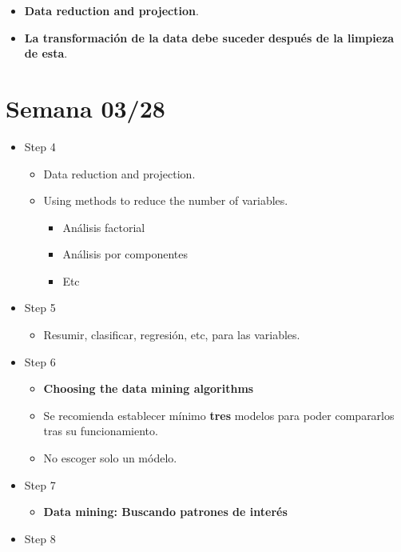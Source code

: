\documentclass[
]{book}
\providecommand{\tightlist}{%
  \setlength{\itemsep}{0pt}\setlength{\parskip}{0pt}}
\begin{document}
\begin{enumerate}
  \begin{itemize}
  \tightlist
  \item
    \textbf{Data reduction and projection}.
  \item
    \textbf{La transformación de la data debe suceder}
    \textbf{después de la limpieza de esta}.
  \end{itemize}
\end{enumerate}

\hypertarget{semana-0328}{%
\chapter{Semana 03/28}\label{semana-0328}}

\begin{itemize}
\tightlist
\item
  Step 4

  \begin{itemize}
  \tightlist
  \item
    Data reduction and projection.
  \item
    Using methods to reduce the number of variables.

    \begin{itemize}
    \tightlist
    \item
      Análisis factorial
    \item
      Análisis por componentes
    \item
      Etc
    \end{itemize}
  \end{itemize}
\item
  Step 5

  \begin{itemize}
  \tightlist
  \item
    Resumir, clasificar, regresión, etc,
    para las variables.
  \end{itemize}
\item
  Step 6

  \begin{itemize}
  \tightlist
  \item
    \textbf{Choosing the data mining algorithms}
  \item
    Se recomienda establecer mínimo \textbf{tres} modelos
    para poder compararlos tras su funcionamiento.
  \item
    No escoger solo un módelo.
  \end{itemize}
\item
  Step 7

  \begin{itemize}
  \tightlist
  \item
    \textbf{Data mining: Buscando patrones de interés}
  \end{itemize}
\item
  Step 8


\end{itemize}
\end{document}
